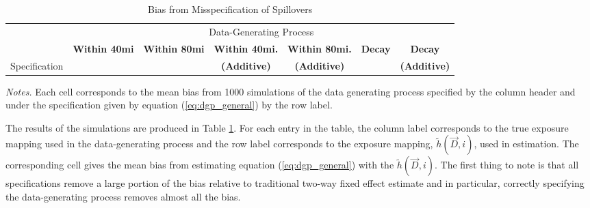 \documentclass[11pt]{article}
\begin{document}
\begin{table}[!tb]
    \caption{Bias from Misspecification of Spillovers}
    \label{tab:misspecification}

    \begin{adjustbox}{width = 1.1\textwidth, center}
        \begin{threeparttable}
            \begin{tabular}{@{} l rrrrrr @{}}
                \toprule
                & \multicolumn{6}{c}{Data-Generating Process} \\
                \cmidrule{2-7}

                & \multicolumn{1}{c}{\textbf{Within 40mi}} & \multicolumn{1}{c}{\textbf{Within 80mi}} & \multicolumn{1}{c}{\textbf{Within 40mi.}} & \multicolumn{1}{c}{\textbf{Within 80mi.}} & \multicolumn{1}{c}{\textbf{Decay}} & \multicolumn{1}{c}{\textbf{Decay}} \\
                Specification & & & \multicolumn{1}{c}{\textbf{(Additive)}} & \multicolumn{1}{c}{\textbf{(Additive)}} & & \multicolumn{1}{c}{\textbf{(Additive)}} \\

 
                \midrule
                
                
                
                
                \bottomrule
            \end{tabular}
            
            \begin{tablenotes}\footnotesize
                \item \textit{Notes.} Each cell corresponds to the mean bias from 1000 simulations of the data generating process specified by the column header and under the specification given by equation (\ref{eq:dgp_general}) by the row label. 
            \end{tablenotes}
        \end{threeparttable}
    \end{adjustbox}
\end{table}

The results of the simulations are produced in Table \ref{tab:misspecification}. For each entry in the table, the column label corresponds to the true exposure mapping used in the data-generating process and the row label corresponds to the exposure mapping, $\tilde{h}(\vec{D}, i)$, used in estimation.  The corresponding cell gives the mean bias from estimating equation (\ref{eq:dgp_general}) with the $\tilde{h}(\vec{D}, i)$. The first thing to note is that all specifications remove a large portion of the bias relative to traditional two-way fixed effect estimate and in particular, correctly specifying the data-generating process removes almost all the bias. 
\end{document}

